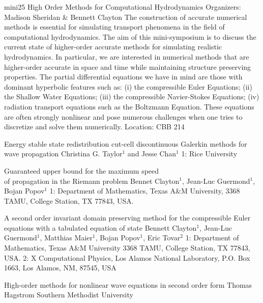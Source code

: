 \mini
{mini25}
{High Order Methods for Computational Hydrodynamics}
{Organizers: Madison Sheridan \& Bennett Clayton}
{The construction of accurate numerical methods is essential for simulating transport phenomena in the field of computational hydrodynamics. The aim of this mini-symposium is to discuss the current state of higher-order accurate methods for simulating realistic hydrodynamics. In particular, we are interested in numerical methods that are higher-order accurate in space and time while maintaining structure preserving properties. The partial differential equations we have in mind are those with dominant hyperbolic features such as: (i) the compressible Euler Equations; (ii) the Shallow Water Equations; (iii) the compressible Navier-Stokes Equations; (iv) radiation transport equations such as the Boltzmann Equation. These equations are often strongly nonlinear and pose numerous challenges when one tries to discretize and solve them numerically.}
{Location: CBB 214}

\begin{talks}
\item\talk
{Energy stable state redistribution cut-cell discontinuous Galerkin methods for wave propagation}
{Christina G. Taylor$^{1}$ and Jesse Chan$^{1}$}
{1: Rice University}
\item\talk
{Guaranteed upper bound for the maximum speed\\ of propagation in the Riemann problem}
{Bennet Clayton$^1$, Jean-Luc Guermond$^1$, Bojan Popov$^1$}
{1: Department of Mathematics, Texas A\&M University, 3368 TAMU, College Station, TX 77843, USA.}
\item\talk
{A second order invariant domain preserving method for the compressible Euler equations with a tabulated equation of state}
{Bennett Clayton$^{1}$, Jean-Luc Guermond$^{1}$, Matthias Maier$^{1}$, Bojan Popov$^{1}$, Eric Tovar$^{2}$}
{1: Department of Mathematics, Texas A\&M University 3368 TAMU, College Station, TX 77843, USA. 2: X Computational Physics, Los Alamos National Laboratory, P.O. Box 1663, Los Alamos, NM, 87545, USA}
\item\talk
{High-order methods for nonlinear wave equations in second order form}
{Thomas Hagstrom}
{Southern Methodist University}
\end{talks}
\room
